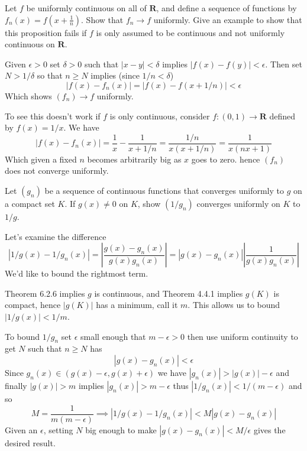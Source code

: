 \begin{exercise}
  Let $f$ be uniformly continuous on all of $\mathbf{R}$, and define a sequence of functions by $f_{n}(x)=f\left(x+\frac{1}{n}\right)$. Show that $f_{n} \rightarrow f$ uniformly. Give an example to show that this proposition fails if $f$ is only assumed to be continuous and not uniformly continuous on $\mathbf{R}$.

\end{exercise}
\begin{solution}
  Given $\epsilon>0$ set $\delta>0$ such that $|x-y|<\delta$ implies $|f(x)-f(y)|<\epsilon$.
  Then set $N > 1/\delta$ so that $n \ge N$ implies (since $1/n<\delta$)
  $$
  |f(x) - f_n(x)| = |f(x) - f(x+1/n)| < \epsilon
  $$
  Which shows $(f_n) \to f$ uniformly.

  To see this doesn't work if $f$ is only continuous, consider $f : (0,1)\to\mathbf{R}$ defined by $f(x) = 1/x$.
  We have
  $$
  |f(x)-f_n(x)| = \frac{1}{x} - \frac{1}{x+1/n} = \frac{1/n}{x(x+1/n)} = \frac{1}{x(nx+1)}
  $$
  Which given a fixed $n$ becomes arbitrarily big as $x$ goes to zero. hence $(f_n)$ does not converge uniformly.
\end{solution}
\begin{exercise}
  Let $\left(g_{n}\right)$ be a sequence of continuous functions that converges uniformly to $g$ on a compact set $K$. If $g(x) \neq 0$ on $K$, show $\left(1 / g_{n}\right)$ converges uniformly on $K$ to $1 / g$.

\end{exercise}
\begin{solution}
  Let's examine the difference
  $$
  |1/g(x) - 1/g_n(x)|
  = \left|\frac{g(x)-g_n(x)}{g(x)g_n(x)}\right|
  = \left|g(x)-g_n(x)\right|\left|\frac{1}{g(x)g_n(x)}\right|
  $$
  We'd like to bound the rightmost term.

  Theorem 6.2.6 implies $g$ is continuous, and Theorem 4.4.1 implies $g(K)$ is compact, hence $|g(K)|$ has a minimum, call it $m$. This allows us to bound $|1/g(x)| < 1/m$.

  To bound $1/g_n$ set $\epsilon$ small enough that $m-\epsilon>0$ then use uniform continuity to get $N$ such that $n \ge N$ has
  $$
  |g(x) - g_n(x)| < \epsilon
  $$
  Since $g_n(x) \in (g(x)-\epsilon, g(x)+\epsilon)$ we have $|g_n(x)| > |g(x)|-\epsilon$ and finally $|g(x)|>m$ implies $|g_n(x)|>m-\epsilon$ thus $|1/g_n(x)| < 1/(m-\epsilon)$ and so
  $$
  M = \frac{1}{m(m-\epsilon)} \implies |1/g(x) - 1/g_n(x)| < M|g(x)-g_n(x)|
  $$
  Given an $\epsilon$, setting $N$ big enough to make $|g(x)-g_n(x)| < M/\epsilon$ gives the desired result.
\end{solution}
